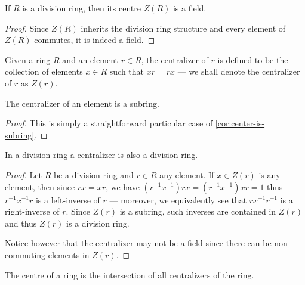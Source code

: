 %
\begin{corollary}
\label{cor:division-ring-center-is-field}
If \(R\) is a division ring, then its centre \(Z(R)\) is a field.
\end{corollary}
%

%
\begin{proof}
Since \(Z(R)\) inherits the division ring structure and every element of
\(Z(R)\) commutes, it is indeed a field.
\end{proof}
%

%
\begin{definition}[Centralizer]
\label{def:ring-centralizer}
Given a ring \(R\) and an element \(r \in R\), the centralizer of \(r\) is
defined to be the collection of elements \(x \in R\) such that \(x r = r x\) ---
we shall denote the centralizer of \(r\) as \(Z(r)\).
\end{definition}
%

%
\begin{corollary}
\label{cor:centralizer-is-subring}
The centralizer of an element is a subring.
\end{corollary}
%

%
\begin{proof}
This is simply a straightforward particular case of
\cref{cor:center-is-subring}.
\end{proof}
%

%
\begin{corollary}
\label{cor:division-ring-centralizer-is-division-ring}
In a division ring a centralizer is also a division ring.
\end{corollary}
%

%
\begin{proof}
Let \(R\) be a division ring and \(r \in R\) any element. If \(x \in Z(r)\) is
any element, then since \(r x = x r\), we have \((r^{-1} x^{-1}) r x = (r^{-1}
x^{-1}) x r = 1\) thus \(r^{-1} x^{-1} r\) is a left-inverse of \(r\) ---
moreover, we equivalently see that \(r x^{-1} r^{-1}\) is a right-inverse of
\(r\). Since \(Z(r)\) is a subring, such inverses are contained in \(Z(r)\) and
thus \(Z(r)\) is a division ring.

Notice however that the centralizer may not be a field since there can be
non-commuting elements in \(Z(r)\).
\end{proof}
%

%
\begin{corollary}
\label{cor:center-is-intersection-of-all-centralizers}
The centre of a ring is the intersection of all centralizers of the ring.
\end{corollary}
%

